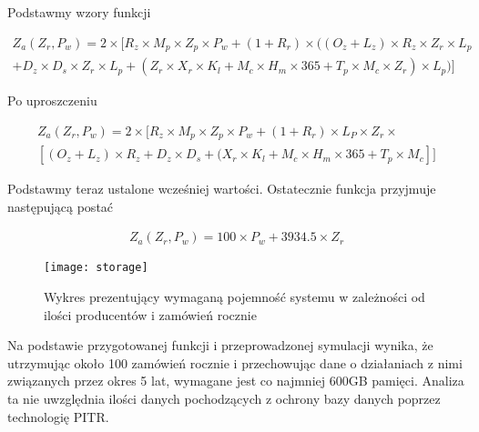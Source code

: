 					Podstawmy wzory funkcji
				
					\begin{equation}
						\begin{split}
							Z_a(Z_r,P_w) = 2 \times [ R_z \times M_p \times Z_p \times P_w + (1 + R_r) \times ( ( O_z + L_z) \times R_z \times Z_r \times L_p \\
							+ D_z \times D_s \times Z_r \times L_p + (Z_r \times X_r \times K_l + M_c \times H_m \times 365 + T_p \times M_c \times Z_r ) \times L_p ) ] 
						\end{split}	
					\end{equation}
					
					Po uproszczeniu
					
					\begin{equation}
						\begin{split}
							Z_a(Z_r,P_w) = 2 \times [R_z \times M_p \times Z_p \times P_w + (1 + R_r) \times L_P \times Z_r \times \\ 
							[ ( O_z + L_z) \times R_z  + D_z \times D_s + ( X_r \times K_l + M_c \times H_m \times 365 + T_p \times M_c ] ] 
						\end{split}
					\end{equation}	
					
					Podstawmy teraz ustalone wcześniej wartości. Ostatecznie funkcja przyjmuje następującą postać
					
					\begin{equation}
						\begin{split}
							Z_a(Z_r,P_w) = 100 \times P_w + 3934.5 \times Z_r
						\end{split}
					\end{equation}
					
					\begin{figure}[H]
						\texttt{[image: storage]}
						\caption{Wykres prezentujący wymaganą pojemność systemu w zależności od ilości producentów i zamówień rocznie}
					\end{figure}
				
					\par Na podstawie przygotowanej funkcji i przeprowadzonej symulacji wynika, że utrzymując około 100 zamówień rocznie i przechowując dane o działaniach z nimi związanych przez okres 5 lat, wymagane jest co najmniej 600GB pamięci. Analiza ta nie uwzględnia ilości danych pochodzących z ochrony bazy danych poprzez technologię PITR.	
 
